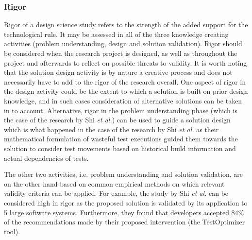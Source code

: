 \documentclass[graybox]{svmult}
\begin{document}
\subsubsection{Rigor %
} 
Rigor of a design science study refers to the strength of the added support for the technological rule. It may be assessed in all of the three knowledge creating activities (problem understanding, design and solution validation). 
Rigor should be considered when the research project is designed, as well as throughout the project and afterwards to reflect on possible threats to validity. 
It is worth noting that the solution design activity is by nature a creative process and does not necessarily have to add to the rigor of the research overall. One aspect of rigor in the design activity could be the extent to which a solution is built on prior design knowledge, and in such cases consideration of alternative solutions can be taken in to account. 
Alternative, rigor in the problem understanding phase (which is the case of the research by Shi \emph{et al.}) can be used to guide a solution design which is what happened in the case of the research by Shi \emph{et al.} as their mathematical formulation of wasteful test executions guided them towards the solution to consider test movements based on historical build information and actual dependencies of tests. 

The other two activities, i.e. problem understanding and solution validation, are on the other hand based on common empirical methods on which relevant validity criteria can be applied. For example, the study by Shi \emph{et al.} can be considered high in rigor as the proposed solution is validated by its application to 5 large software systems.  Furthermore, they found that developers accepted 84\% of the recommendations made by their proposed intervention (the TestOptimizer tool). 
\end{document}
